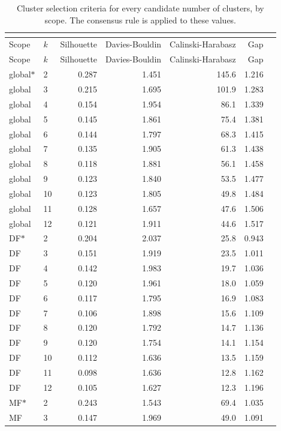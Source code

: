 \begin{longtable}{llrrrrr}
\caption{Cluster selection criteria for every candidate number of clusters, by scope. The consensus rule is applied to these values.}\\
\label{tab:kselection}\\
\toprule
Scope & $k$ & Silhouette & Davies-Bouldin & Calinski-Harabasz & Gap \\
\midrule
\endfirsthead
\toprule
Scope & $k$ & Silhouette & Davies-Bouldin & Calinski-Harabasz & Gap \\
\midrule
\endhead
global$\ast$ & 2 & 0.287 & 1.451 & 145.6 & 1.216 \\
global & 3 & 0.215 & 1.695 & 101.9 & 1.283 \\
global & 4 & 0.154 & 1.954 & 86.1 & 1.339 \\
global & 5 & 0.145 & 1.861 & 75.4 & 1.381 \\
global & 6 & 0.144 & 1.797 & 68.3 & 1.415 \\
global & 7 & 0.135 & 1.905 & 61.3 & 1.438 \\
global & 8 & 0.118 & 1.881 & 56.1 & 1.458 \\
global & 9 & 0.123 & 1.840 & 53.5 & 1.477 \\
global & 10 & 0.123 & 1.805 & 49.8 & 1.484 \\
global & 11 & 0.128 & 1.657 & 47.6 & 1.506 \\
global & 12 & 0.121 & 1.911 & 44.6 & 1.517 \\
DF$\ast$ & 2 & 0.204 & 2.037 & 25.8 & 0.943 \\
DF & 3 & 0.151 & 1.919 & 23.5 & 1.011 \\
DF & 4 & 0.142 & 1.983 & 19.7 & 1.036 \\
DF & 5 & 0.120 & 1.961 & 18.0 & 1.059 \\
DF & 6 & 0.117 & 1.795 & 16.9 & 1.083 \\
DF & 7 & 0.106 & 1.898 & 15.6 & 1.109 \\
DF & 8 & 0.120 & 1.792 & 14.7 & 1.136 \\
DF & 9 & 0.120 & 1.754 & 14.1 & 1.154 \\
DF & 10 & 0.112 & 1.636 & 13.5 & 1.159 \\
DF & 11 & 0.098 & 1.636 & 12.8 & 1.162 \\
DF & 12 & 0.105 & 1.627 & 12.3 & 1.196 \\
MF$\ast$ & 2 & 0.243 & 1.543 & 69.4 & 1.035 \\
MF & 3 & 0.147 & 1.969 & 49.0 & 1.091 \\

\end{longtable}
